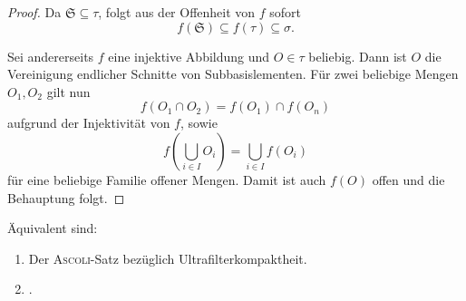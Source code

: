 \begin{proof}
  Da $\mathfrak{S} \subseteq \tau$, folgt aus der Offenheit von $f$ sofort 
  \begin{displaymath}
    f(\mathfrak{S}) \subseteq f(\tau) \subseteq \sigma.
  \end{displaymath}

  Sei andererseits $f$ eine injektive Abbildung und $O \in \tau$ beliebig.
  Dann ist $O$ die Vereinigung endlicher Schnitte von Subbasislementen.
  Für zwei beliebige Mengen $O_1,O_2$ gilt nun 
  \begin{displaymath}
    f(O_1 \cap O_2) = f(O_1) \cap f(O_n)
  \end{displaymath}
  aufgrund der Injektivität von $f$, sowie 
  \begin{displaymath}
    f \left(\bigcup_{i \in I} O_i \right) = \bigcup_{i \in I} f(O_i)
  \end{displaymath}
  für eine beliebige Familie offener Mengen.
  Damit ist auch $f(O)$ offen und die Behauptung folgt.
\end{proof}

\begin{thm}
  \label{thm:ultrafiltercompact}
  Äquivalent sind:
  \begin{enumerate}[(1)]
    \item Der \textsc{Ascoli}-Satz bezüglich Ultrafilterkompaktheit.
    \item \PIT.
  \end{enumerate}
\end{thm}

